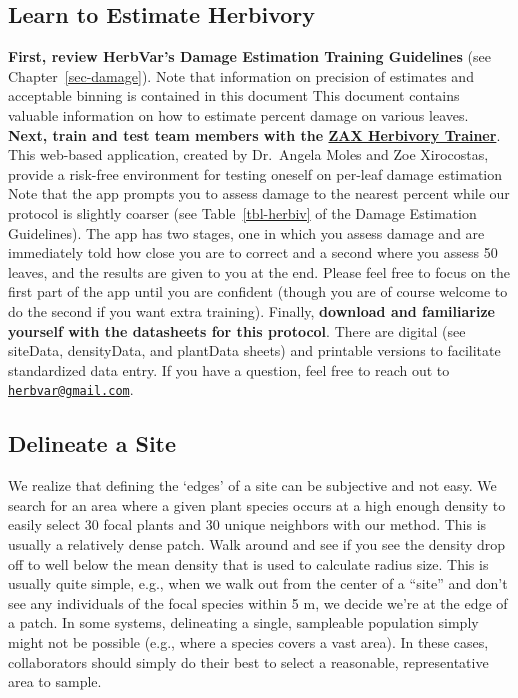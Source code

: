 \documentclass[
  letterpaper,
  oneside,
  open=any]{scrbook}
\begin{document}
\subsection{Learn to Estimate
Herbivory}\label{learn-to-estimate-herbivory}

\textbf{First, review HerbVar's Damage Estimation Training Guidelines}
(see Chapter~\ref{sec-damage}). Note that information on precision of
estimates and acceptable binning is contained in this document This
document contains valuable information on how to estimate percent damage
on various leaves. \textbf{Next, train and test team members with the
\href{https://zaxherbivorytrainer.com/}{ZAX Herbivory Trainer}}. This
web-based application, created by Dr.~Angela Moles and Zoe Xirocostas,
provide a risk-free environment for testing oneself on per-leaf damage
estimation Note that the app prompts you to assess damage to the nearest
percent while our protocol is slightly coarser (see
Table~\ref{tbl-herbiv} of the Damage Estimation Guidelines). The app has
two stages, one in which you assess damage and are immediately told how
close you are to correct and a second where you assess 50 leaves, and
the results are given to you at the end. Please feel free to focus on
the first part of the app until you are confident (though you are of
course welcome to do the second if you want extra training). Finally,
\textbf{download and familiarize yourself with the datasheets for this
protocol}. There are digital (see siteData, densityData, and plantData
sheets) and printable versions to facilitate standardized data entry. If
you have a question, feel free to reach out to
\href{mailto:herbvar@gmail.com}{\nolinkurl{herbvar@gmail.com}}.

\subsection{Delineate a Site}\label{delineate-a-site}

We realize that defining the `edges' of a site can be subjective and not
easy. We search for an area where a given plant species occurs at a high
enough density to easily select 30 focal plants and 30 unique neighbors
with our method. This is usually a relatively dense patch. Walk around
and see if you see the density drop off to well below the mean density
that is used to calculate radius size. This is usually quite simple,
e.g., when we walk out from the center of a ``site'' and don't see any
individuals of the focal species within 5 m, we decide we're at the edge
of a patch. In some systems, delineating a single, sampleable population
simply might not be possible (e.g., where a species covers a vast area).
In these cases, collaborators should simply do their best to select a
reasonable, representative area to sample.
\end{document}
